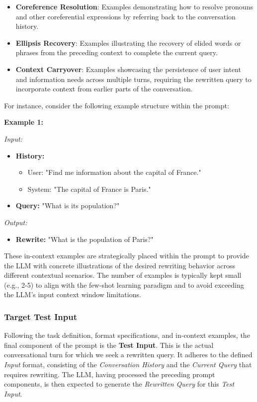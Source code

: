 \begin{itemize}
    \item \textbf{Coreference Resolution}: Examples demonstrating how to resolve pronouns and other coreferential expressions by referring back to the conversation history.
    \item \textbf{Ellipsis Recovery}: Examples illustrating the recovery of elided words or phrases from the preceding context to complete the current query.
    \item \textbf{Context Carryover}: Examples showcasing the persistence of user intent and information needs across multiple turns, requiring the rewritten query to incorporate context from earlier parts of the conversation.
\end{itemize}

For instance, consider the following example structure within the prompt:

\textbf{Example 1:}

\textit{Input:}
\begin{itemize}
    \item \textbf{History:}
    \begin{itemize}
        \item User: "Find me information about the capital of France."
        \item System: "The capital of France is Paris."
    \end{itemize}
    \item \textbf{Query:} "What is its population?"
\end{itemize}
\textit{Output:}
\begin{itemize}
        \item \textbf{Rewrite:} "What is the population of Paris?"
\end{itemize}


These in-context examples are strategically placed within the prompt to provide the LLM with concrete illustrations of the desired rewriting behavior across different contextual scenarios.  The number of examples is typically kept small (e.g., 2-5) to align with the few-shot learning paradigm and to avoid exceeding the LLM's input context window limitations.

\subsubsection{Target Test Input}

Following the task definition, format specifications, and in-context examples, the final component of the prompt is the \textbf{Test Input}. This is the actual conversational turn for which we seek a rewritten query.  It adheres to the defined \textit{Input} format, consisting of the \textit{Conversation History} and the \textit{Current Query} that requires rewriting.  The LLM, having processed the preceding prompt components, is then expected to generate the \textit{Rewritten Query} for this \textit{Test Input}.

